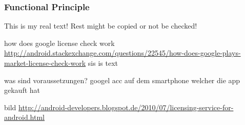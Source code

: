 \subsubsection{Functional Principle} \label{subsection:license-google-functional}
This is my real text! Rest might be copied or not be checked!

how does google license check work \url{http://android.stackexchange.com/questions/22545/how-does-google-plays-market-license-check-work}\newline
sis is text

was sind voraussetzungen? googel acc auf dem smartphone welcher die app gekauft hat\newline

bild \url{http://android-developers.blogspot.de/2010/07/licensing-service-for-android.html}
